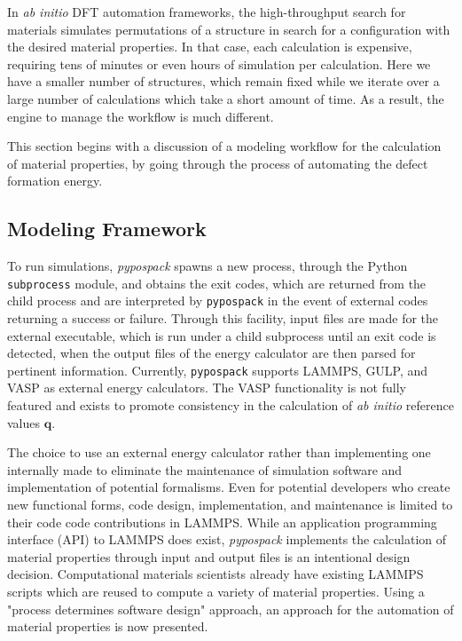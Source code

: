 In \emph{ab initio} DFT automation frameworks, the high-throughput search for materials simulates permutations of a structure in search for a configuration with the desired material properties.  In that case, each calculation is expensive, requiring tens of minutes or even hours of simulation per calculation.  Here we have a smaller number of structures, which remain fixed while we iterate over a large number of calculations which take a short amount of time.  As a result, the engine to manage the workflow is much different.

This section begins with a discussion of a modeling workflow for the calculation of material properties, by going through the process of automating the defect formation energy.

\subsection{Modeling Framework}

To run simulations, \emph{pypospack} spawns a new process, through the Python \verb|subprocess| module, and obtains the exit codes, which are returned from the child process and are interpreted by \verb|pypospack| in the event of external codes returning a success or failure.  Through this facility, input files are made for the external executable, which is run under a child subprocess until an exit code is detected, when the output files of the energy calculator are then parsed for pertinent information.  Currently, \verb|pypospack| supports LAMMPS, GULP, and VASP as external energy calculators.  The VASP functionality is not fully featured and exists to promote consistency in the calculation of \emph{ab initio} reference values $\bm{q}$.

The choice to use an external energy calculator rather than implementing one internally made to eliminate the maintenance of simulation software and implementation of potential formalisms.  Even for potential developers who create new functional forms, code design, implementation, and maintenance is limited to their code code contributions in LAMMPS.
While an application programming interface (API) to LAMMPS does exist, \emph{pypospack} implements the calculation of material properties through input and output files is an intentional design decision.  Computational materials scientists already have existing LAMMPS scripts which are reused to compute a variety of material properties.  Using a "process determines software design" approach, an approach for the automation of material properties is now presented.


